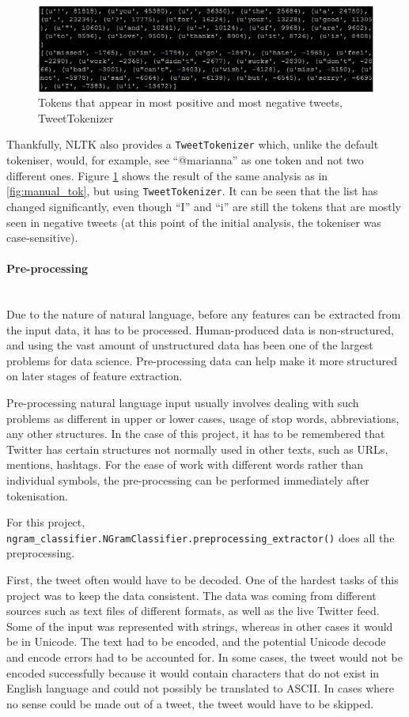 \begin{figure}
    \centering
    \includegraphics[width=\textwidth]{most_pos_neg_tw_tokenizer}
    \caption{Tokens that appear in most positive and most negative tweets, TweetTokenizer}
    \label{fig:tweettok}
\end{figure}


Thankfully, NLTK also provides a \texttt{TweetTokenizer} which, unlike the default tokeniser, would, for example, see ``@marianna'' as one token and not two different ones. Figure \ref{fig:tweettok} shows the result of the same analysis as in \ref{fig:manual_tok}, but using \texttt{TweetTokenizer}. It can be seen that the list has changed significantly, even though ``I'' and ``i'' are still the tokens that are mostly seen in negative tweets (at this point of the initial analysis, the tokeniser was case-sensitive). 


\paragraph{Pre-processing} \mbox{} \\
Due to the nature of natural language, before any features can be extracted from the input data, it has to be processed. Human-produced data is non-structured, and using the vast amount of unstructured data has been one of the largest problems for data science. Pre-processing data can help make it more structured on later stages of feature extraction. 

Pre-processing natural language input usually involves dealing with such problems as different in upper or lower cases, usage of stop words, abbreviations, any other structures. In the case of this project, it has to be remembered that Twitter has certain structures not normally used in other texts, such as URLs, mentions, hashtags. For the ease of work with different words rather than individual symbols, the pre-processing can be performed immediately after tokenisation. 

For this project, \texttt{ngram\_classifier.NGramClassifier.preprocessing\_extractor()} does all the preprocessing. 

First, the tweet often would have to be decoded. One of the hardest tasks of this project was to keep the data consistent. The data was coming from different sources such as text files of different formats, as well as the live Twitter feed. Some of the input was represented with strings, whereas in other cases it would be in Unicode. The text had to be encoded, and the potential Unicode decode and encode errors had to be accounted for. In some cases, the tweet would not be encoded successfully because it would contain characters that do not exist in English language and could not possibly be translated to ASCII. In cases where no sense could be made out of a tweet, the tweet would have to be skipped. 

